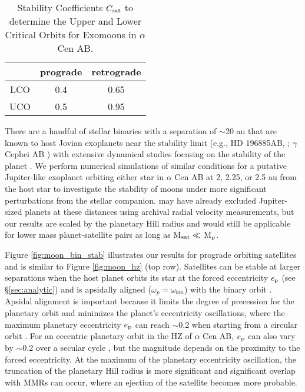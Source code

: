 \documentclass[preprint]{aastex63}
\begin{document}
\begin{table}
	\centering
	\caption{Stability Coefficients $ C_{\rm sat}$ to determine the Upper and Lower Critical Orbits for Exomoons in $\alpha$ Cen AB.}
	\label{tab:stab_coeff}
	\begin{tabular}{ccc} %
		\hline
		  & prograde & retrograde\\
		\hline
		LCO & 0.4 & 0.65\\
		UCO & 0.5 & 0.95\\
		\hline
	\end{tabular}
\end{table}

There are a handful of stellar binaries with a separation of $\sim$20 au that are known to host Jovian exoplanets near the stability limit (e.g., HD 196885AB, \cite{Chauvin2007,Correia2008,Fischer2009,Chauvin2011}; $\gamma$ Cephei AB \cite{Hatzes2003,Torres2007}) with extensive dynamical studies focusing on the stability of the planet \cite{Thebault2011,Giuppone2011,Giuppone2012,Satyal2013,Satyal2014}.  We perform numerical simulations of similar conditions for a putative Jupiter-like exoplanet orbiting either star in $\alpha$ Cen AB at 2, 2.25, or 2.5 au from the host star to investigate the stability of moons under more significant perturbations from the stellar companion.  \cite{Zhao2018} may have already excluded Jupiter-sized planets at these distances using archival radial velocity measurements, but our results are scaled by the planetary Hill radius and would still be applicable for lower mass planet-satellite pairs as long as M$_{\rm sat}\ll  $ M$_{\rm p}$.  

Figure \ref{fig:moon_bin_stab} illustrates our results for prograde orbiting satellites and is similar to Figure \ref{fig:moon_hz} (top row).  Satellites can be stable at larger separations when the host planet orbits its star at the forced eccentricity $\epsilon_{\rm p}$ (see \S\ref{sec:analytic}) and is apsidally aligned ($\omega_p = \omega_{bin}$) with the binary orbit \citep{andrade2017secular,Quarles2018}.  Apsidal alignment is important because it limits the degree of precession for the planetary orbit and minimizes the planet's eccentricity oscillations, where the maximum planetary eccentricity $e_{\rm p}$ can reach $\sim$0.2 when starting from a circular orbit \citep{Quarles2018}. { For an eccentric planetary orbit in the HZ of $\alpha$ Cen AB, $e_{\rm p}$ can also vary by $\sim$0.2 over a secular cycle \citep{Quarles2018}, but the magnitude depends on the proximity to the forced eccentricity.}  At the maximum of the planetary eccentricity oscillation, the truncation of the planetary Hill radius is more significant and significant overlap with MMRs can occur, where an ejection of the satellite becomes more probable.  
\end{document}
